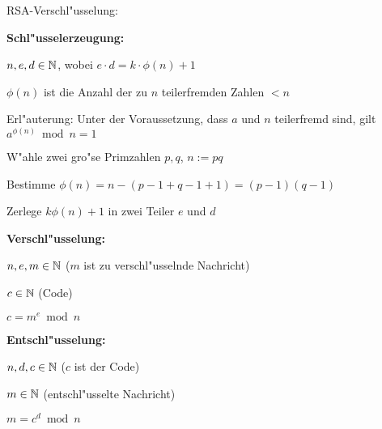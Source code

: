 \algorithm RSA-Verschl"usselung:{
  \textbf{Schl"usselerzeugung:}

  \aim $n,e,d\in\mathbb N$, wobei $e\cdot d = k\cdot\phi(n)+1$ 
   
    $\phi(n)$ ist die Anzahl der zu $n$ teilerfremden Zahlen $<n$
    
    Erl"auterung: Unter der Voraussetzung, dass $a$ und $n$ teilerfremd sind,
    gilt $a^{\phi(n)}\bmod n=1$ 
  
  \begin{proc}
    \item W"ahle zwei gro"se Primzahlen $p,q$, $n:=pq$
    \item Bestimme $\phi(n)=n-(p-1+q-1+1)=(p-1)(q-1)$
    \item Zerlege $k\phi(n)+1$ in zwei Teiler $e$ und $d$
  \end{proc}
  
  \textbf{Verschl"usselung:}
  
  \given $n,e,m\in\mathbb N$ ($m$ ist zu verschl"usselnde Nachricht)
  
  \aim $c\in\mathbb N$ (Code)

  \begin{proc}
    \item $c=m^e \bmod n$
  \end{proc}

  \textbf{Entschl"usselung:}

  \given $n,d,c\in\mathbb N$ ($c$ ist der Code)
  
  \aim $m\in\mathbb N$ (entschl"usselte Nachricht)

  \begin{proc}
    \item $m=c^d\bmod n$
  \end{proc}
}
